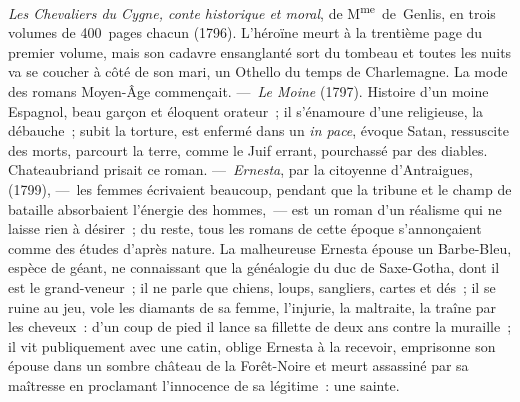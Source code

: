 \documentclass[french,twoside]{book} %
\begin{document}
\label{p588}\emph{Les Chevaliers du Cygne, conte historique et moral}, de M\textsuperscript{me} de Genlis, en trois volumes de 400 pages chacun (1796). L’héroïne meurt à la trentième page du premier volume, mais son cadavre ensanglanté sort du tombeau et toutes les nuits va se coucher à côté de son mari, un Othello du temps de Charlemagne. La mode des romans Moyen-Âge commençait. — \emph{Le Moine} (1797). Histoire d’un moine Espagnol, beau garçon et éloquent orateur ; il s’énamoure d’une religieuse, la débauche ; subit la torture, est enfermé dans un {\itshape in pace}, évoque Satan, ressuscite des morts, parcourt la terre, comme le Juif errant, pourchassé par des diables. Chateaubriand prisait ce roman. — \emph{Ernesta}, par la citoyenne d’Antraigues, (1799), — les femmes écrivaient beaucoup, pendant que la tribune et le champ de bataille absorbaient l’énergie des hommes, — est un roman d’un réalisme qui ne laisse rien à désirer ; du reste, tous les romans de cette époque s’annonçaient comme des études d’après nature. La malheureuse Ernesta épouse un Barbe-Bleu, espèce de géant, ne connaissant que la généalogie du duc de Saxe-Gotha, dont il est le grand-veneur ; il ne parle que chiens, loups, sangliers, cartes et dés ; il se ruine au jeu, vole les diamants de sa femme, l’injurie, la maltraite, la traîne par les cheveux : d’un coup de pied il lance sa fillette de deux ans contre la muraille ; il vit publiquement avec une catin, oblige Ernesta à la recevoir, emprisonne son épouse dans un sombre château de la Forêt-Noire et meurt assassiné par sa maîtresse en proclamant l’innocence de sa légitime : une sainte.\par
\end{document}
